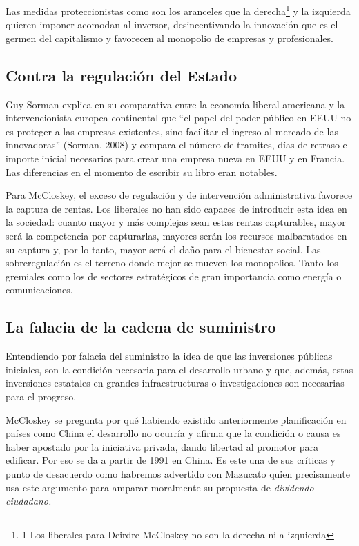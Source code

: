 \documentclass[
]{article}
\begin{document}
Las medidas proteccionistas como son los aranceles que la
derecha\footnote{1 Los liberales para Deirdre McCloskey no son la
  derecha ni a izquierda} y la izquierda quieren imponer acomodan al
inversor, desincentivando la innovación que es el germen del capitalismo
y favorecen al monopolio de empresas y profesionales.

\hypertarget{contra-la-regulaciuxf3n-del-estado}{%
\subsection{Contra la regulación del
Estado}\label{contra-la-regulaciuxf3n-del-estado}}

Guy Sorman explica en su comparativa entre la economía liberal americana
y la intervencionista europea continental que ``el papel del poder
público en EEUU no es proteger a las empresas existentes, sino facilitar
el ingreso al mercado de las innovadoras'' (Sorman, 2008) y compara el
número de tramites, días de retraso e importe inicial necesarios para
crear una empresa nueva en EEUU y en Francia. Las diferencias en el
momento de escribir su libro eran notables.

Para McCloskey, el exceso de regulación y de intervención administrativa
favorece la captura de rentas. Los liberales no han sido capaces de
introducir esta idea en la sociedad: cuanto mayor y más complejas sean
estas rentas capturables, mayor será la competencia por capturarlas,
mayores serán los recursos malbaratados en su captura y, por lo tanto,
mayor será el daño para el bienestar social. Las sobreregulación es el
terreno donde mejor se mueven los monopolios. Tanto los gremiales como
los de sectores estratégicos de gran importancia como energía o
comunicaciones.

\hypertarget{la-falacia-de-la-cadena-de-suministro}{%
\subsection{La falacia de la cadena de
suministro}\label{la-falacia-de-la-cadena-de-suministro}}

Entendiendo por falacia del suministro la idea de que las inversiones
públicas iniciales, son la condición necesaria para el desarrollo urbano
y que, además, estas inversiones estatales en grandes infraestructuras o
investigaciones son necesarias para el progreso.

McCloskey se pregunta por qué habiendo existido anteriormente
planificación en países como China el desarrollo no ocurría y afirma que
la condición o causa es haber apostado por la iniciativa privada, dando
libertad al promotor para edificar. Por eso se da a partir de 1991 en
China. Es este una de sus críticas y punto de desacuerdo como habremos
advertido con Mazucato quien precisamente usa este argumento para
amparar moralmente su propuesta de \emph{dividendo ciudadano.}
\end{document}
